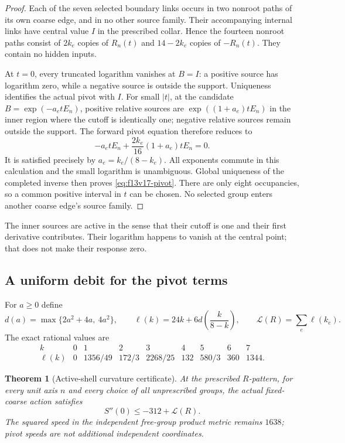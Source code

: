 \documentclass[11pt,oneside]{article}
\newtheorem{theorem}{Theorem}[section]
\begin{document}
\begin{proof}
Each of the seven selected boundary links occurs
in two nonroot paths of its own coarse edge, and
in no other source family. Their accompanying internal
links have central value \(I\) in the prescribed collar.
Hence the fourteen nonroot paths consist of \(2k_e\)
copies of \(R_n(t)\) and \(14-2k_e\) copies of
\(-R_n(t)\). They contain no hidden inputs.

At \(t=0\), every truncated logarithm vanishes at
\(B=I\): a positive source has logarithm zero, while
a negative source is outside the support. Uniqueness
identifies the actual pivot with \(I\).
For small \(|t|\), at the candidate
\(B=\exp(-a_etE_n)\), positive relative sources
are \(\exp((1+a_e)tE_n)\) in the inner region
where the cutoff is identically one; negative
relative sources remain outside the support.
The forward pivot equation therefore reduces to
\[
 -a_etE_n+\frac{2k_e}{16}(1+a_e)tE_n=0.
\]
It is satisfied precisely by \(a_e=k_e/(8-k_e)\).
All exponents commute in this calculation and the
small logarithm is unambiguous. Global uniqueness
of the completed inverse then proves
\eqref{eq:f13v17-pivot}. There are only eight
occupancies, so a common positive interval in \(t\)
can be chosen. No selected group enters another
coarse edge's source family.
\end{proof}

The inner sources are active in the sense that their
cutoff is one and their first derivative contributes.
Their logarithm happens to vanish at the central point;
that does not make their response zero.

\subsection{A uniform debit for the pivot terms}

For \(a\ge0\) define
\[
 d(a)=\max\{2a^2+4a,\ 4a^2\},\qquad
 \ell(k)=24k+6d\!\left(\frac{k}{8-k}\right),\qquad
                         \mathcal L(R)=\sum_e\ell(k_e).
\]
The exact rational values are
\[
\begin{array}{c|rrrrrrrr}
 k&0&1&2&3&4&5&6&7\\ \hline
 \ell(k)&0&1356/49&172/3&2268/25&132&580/3&360&1344 .
\end{array}
\]

\begin{theorem}[Active-shell curvature certificate]
\label{thm:f13v17-curvature}
At the prescribed \(R\)-pattern, for every unit
axis \(n\) and every choice of all unprescribed groups,
the actual fixed-coarse action satisfies
\begin{equation}\label{eq:f13v17-curvature}
             S''(0)\le-312+\mathcal L(R).
\end{equation}
The squared speed in the independent free-group
product metric remains \(1638\); pivot speeds are
not additional independent coordinates.
\end{theorem}
\end{document}
